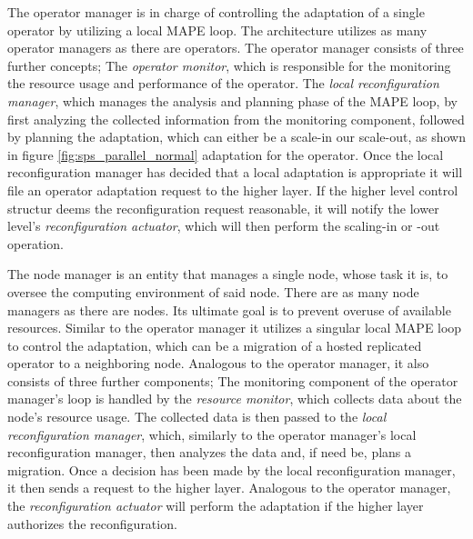         \quad The operator manager is in charge of controlling the adaptation of a single operator by utilizing a local MAPE loop.
        The architecture utilizes as many operator managers as there are operators.
        The operator manager consists of three further concepts;
        The \textit{operator monitor}, which is responsible for the monitoring the resource usage and performance of the operator.
        The \textit{local reconfiguration manager}, which manages the analysis and planning phase of the MAPE loop, by first analyzing the collected information 
        from the monitoring component, followed by planning the adaptation, which can either be a scale-in our scale-out, 
        as shown in figure \ref{fig:sps_parallel_normal} adaptation for the operator.
        Once the local reconfiguration manager has decided that a local adaptation is appropriate it will file an operator adaptation request to the higher layer.
        If the higher level control structur deems the reconfiguration request reasonable, it will notify the lower level's \textit{reconfiguration actuator}, which will then 
        perform the scaling-in or -out operation.

        \quad The node manager is an entity that manages a single node, whose task it is, to oversee the computing environment of said node.
        There are as many node managers as there are nodes.
        Its ultimate goal is to prevent overuse of available resources.
        Similar to the operator manager it utilizes a singular local MAPE loop to control the adaptation, 
        which can be a migration of a hosted replicated operator to a neighboring node. 
        Analogous to the operator manager, it also consists of three further components;
        The monitoring component of the operator manager's loop is handled by the \textit{resource monitor}, which collects data about the node's resource usage.
        The collected data is then passed to the \textit{local reconfiguration manager}, which, similarly to the operator manager's local reconfiguration manager, then
        analyzes the data and, if need be, plans a migration. 
        Once a decision has been made by the local reconfiguration manager, it then sends a request to the higher layer. Analogous to the operator manager, the \textit{reconfiguration actuator} will perform
        the adaptation if the higher layer authorizes the reconfiguration.

